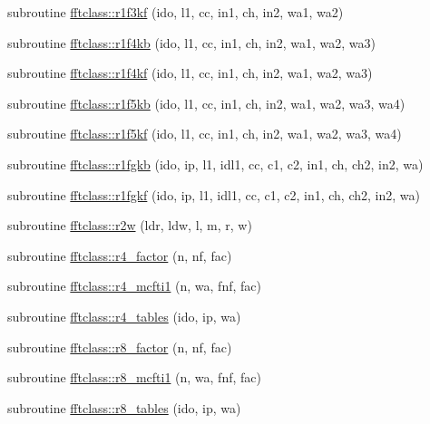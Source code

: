 \begin{DoxyCompactItemize}
\item 
subroutine \mbox{\hyperlink{namespacefftclass_a382f39146e7d8e1450810efdc6f4cd79}{fftclass\+::r1f3kf}} (ido, l1, cc, in1, ch, in2, wa1, wa2)
\item 
subroutine \mbox{\hyperlink{namespacefftclass_a71f9b9a5e0173f9ddef4dd0fc92e6164}{fftclass\+::r1f4kb}} (ido, l1, cc, in1, ch, in2, wa1, wa2, wa3)
\item 
subroutine \mbox{\hyperlink{namespacefftclass_ac2e28efef69b7ac5c599c51dc9be973d}{fftclass\+::r1f4kf}} (ido, l1, cc, in1, ch, in2, wa1, wa2, wa3)
\item 
subroutine \mbox{\hyperlink{namespacefftclass_a42f5de07f4eb994cbe15a8526291566b}{fftclass\+::r1f5kb}} (ido, l1, cc, in1, ch, in2, wa1, wa2, wa3, wa4)
\item 
subroutine \mbox{\hyperlink{namespacefftclass_acc419931cfa3ec3e19e6264b35e83aae}{fftclass\+::r1f5kf}} (ido, l1, cc, in1, ch, in2, wa1, wa2, wa3, wa4)
\item 
subroutine \mbox{\hyperlink{namespacefftclass_aa5cb9e2d3b6aa9d5adcb4144cd17f10e}{fftclass\+::r1fgkb}} (ido, ip, l1, idl1, cc, c1, c2, in1, ch, ch2, in2, wa)
\item 
subroutine \mbox{\hyperlink{namespacefftclass_adb327056327448d0a605271d57091578}{fftclass\+::r1fgkf}} (ido, ip, l1, idl1, cc, c1, c2, in1, ch, ch2, in2, wa)
\item 
subroutine \mbox{\hyperlink{namespacefftclass_a6d2b5609d651241869584e962d234756}{fftclass\+::r2w}} (ldr, ldw, l, m, r, w)
\item 
subroutine \mbox{\hyperlink{namespacefftclass_ad76d163c3f3aec3b5a3bbb3285498ffd}{fftclass\+::r4\+\_\+factor}} (n, nf, fac)
\item 
subroutine \mbox{\hyperlink{namespacefftclass_aecf4238ff306578dd37cab143ce6efac}{fftclass\+::r4\+\_\+mcfti1}} (n, wa, fnf, fac)
\item 
subroutine \mbox{\hyperlink{namespacefftclass_a882cd8d6eeb407d2b10ee9b3d9fee8b9}{fftclass\+::r4\+\_\+tables}} (ido, ip, wa)
\item 
subroutine \mbox{\hyperlink{namespacefftclass_a22bddf5efe99e8dcd5737d2d73ae832f}{fftclass\+::r8\+\_\+factor}} (n, nf, fac)
\item 
subroutine \mbox{\hyperlink{namespacefftclass_a89d64713ecbaec08b4d5180fcbc56cea}{fftclass\+::r8\+\_\+mcfti1}} (n, wa, fnf, fac)
\item 
subroutine \mbox{\hyperlink{namespacefftclass_a68ac2e6dba058989d5e0d7fbee9aa19f}{fftclass\+::r8\+\_\+tables}} (ido, ip, wa)
\item 

\end{DoxyCompactItemize}
